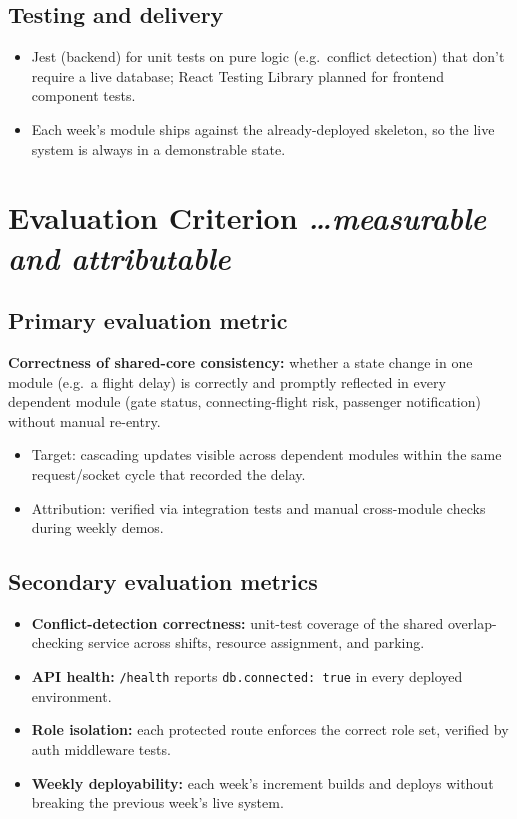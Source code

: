 \documentclass[11pt,a4paper]{article}
\newcommand{\BvrHint}[1]{%
  {\normalfont\normalsize\itshape\hfill #1}}
\begin{document}
\subsection{Testing and delivery}
\begin{itemize}[leftmargin=0.7cm]
    \item Jest (backend) for unit tests on pure logic (e.g.\ conflict
      detection) that don't require a live database; React Testing
      Library planned for frontend component tests.
    \item Each week's module ships against the already-deployed
      skeleton, so the live system is always in a demonstrable state.
\end{itemize}

\section{Evaluation Criterion %
\BvrHint{\ldots measurable and attributable}}

\subsection{Primary evaluation metric}
\textbf{Correctness of shared-core consistency:} whether a state
change in one module (e.g.\ a flight delay) is correctly and promptly
reflected in every dependent module (gate status, connecting-flight
risk, passenger notification) without manual re-entry.
\begin{itemize}[leftmargin=0.7cm]
    \item Target: cascading updates visible across dependent modules
      within the same request/socket cycle that recorded the delay.
    \item Attribution: verified via integration tests and manual
      cross-module checks during weekly demos.
\end{itemize}

\subsection{Secondary evaluation metrics}
\begin{itemize}[leftmargin=0.7cm]
    \item \textbf{Conflict-detection correctness:} unit-test coverage
      of the shared overlap-checking service across shifts, resource
      assignment, and parking.
    \item \textbf{API health:} \texttt{/health} reports
      \texttt{db.connected: true} in every deployed environment.
    \item \textbf{Role isolation:} each protected route enforces the
      correct role set, verified by auth middleware tests.
    \item \textbf{Weekly deployability:} each week's increment builds
      and deploys without breaking the previous week's live system.
\end{itemize}
\end{document}
